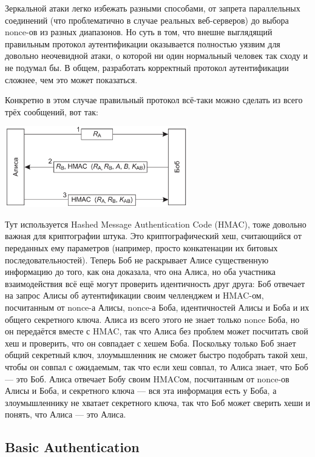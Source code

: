 \documentclass{../mcstext}
\begin{document}
Зеркальной атаки легко избежать разными способами, от запрета параллельных соединений (что проблематично в случае реальных веб-серверов) до выбора nonce-ов из разных диапазонов. Но суть в том, что внешне выглядящий правильным протокол аутентификации оказывается полностью уязвим для довольно неочевидной атаки, о которой ни один нормальный человек так сходу и не подумал бы. В общем, разработать корректный протокол аутентификации сложнее, чем это может показаться.

Конкретно в этом случае правильный протокол всё-таки можно сделать из всего трёх сообщений, вот так:

\begin{center}
    \includegraphics[width=0.6\textwidth]{hmacs.png}
\end{center}

Тут используется Hashed Message Authentication Code (HMAC), тоже довольно важная для криптографии штука. Это криптографический хеш, считающийся от переданных ему параметров (например, просто конкатенации их битовых последовательностей). Теперь Боб не раскрывает Алисе существенную информацию до того, как она доказала, что она Алиса, но оба участника взаимодействия всё ещё могут проверить идентичность друг друга: Боб отвечает на запрос Алисы об аутентификации своим челленджем и HMAC-ом, посчитанным от nonce-а Алисы, nonce-а Боба, идентичностей Алисы и Боба и их общего секретного ключа. Алиса из всего этого не знает только nonce Боба, но он передаётся вместе с HMAC, так что Алиса без проблем может посчитать свой хеш и проверить, что он совпадает с хешем Боба. Поскольку только Боб знает общий секретный ключ, злоумышленник не сможет быстро подобрать такой хеш, чтобы он совпал с ожидаемым, так что если хеш совпал, то Алиса знает, что Боб --- это Боб. Алиса отвечает Бобу своим HMACом, посчитанным от nonce-ов Алисы и Боба, и секретного ключа --- вся эта информация есть у Боба, а злоумышленнику не хватает секретного ключа, так что Боб может сверить хеши и понять, что Алиса --- это Алиса.

\subsection{Basic Authentication}
\end{document}
